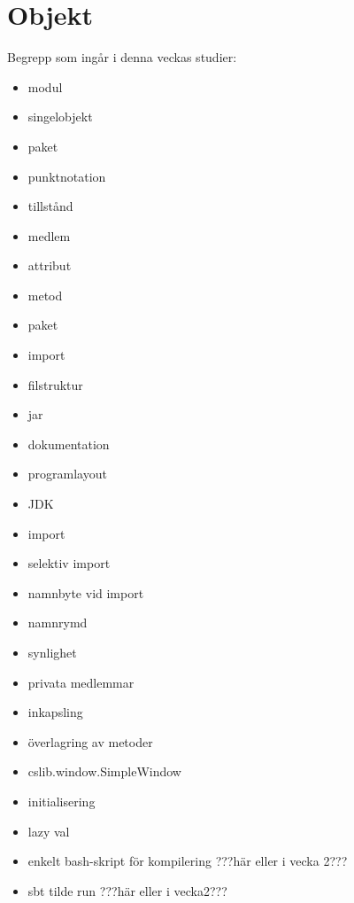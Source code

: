 \chapter{Objekt}\label{chapter:W04}
Begrepp som ingår i denna veckas studier:
\begin{itemize}[noitemsep,label={$\square$},leftmargin=*]
\item modul
\item singelobjekt
\item paket
\item punktnotation
\item tillstånd
\item medlem
\item attribut
\item metod
\item paket
\item import
\item filstruktur
\item jar
\item dokumentation
\item programlayout
\item JDK
\item import
\item selektiv import
\item namnbyte vid import
\item namnrymd
\item synlighet
\item privata medlemmar
\item inkapsling
\item överlagring av metoder
\item cslib.window.SimpleWindow
\item initialisering
\item lazy val
\item enkelt bash-skript för kompilering ???här eller i vecka 2???
\item sbt tilde run ???här eller i vecka2???\end{itemize}
